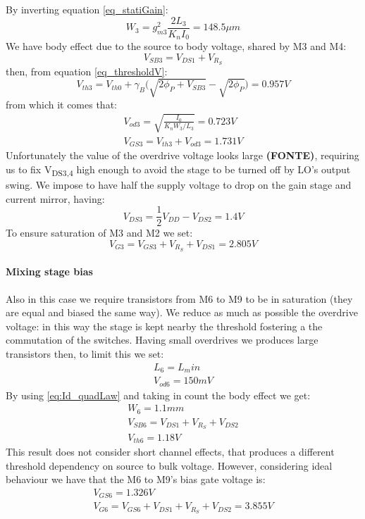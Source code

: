 By inverting equation \ref{eq_statiGain}:
\begin{equation}
W_3 = g_{m3}^2\frac{2L_{3}}{K_nI_0} = 148.5 \mu m
\end{equation}
We have body effect due to the source to body voltage, shared by M3 and M4:
\begin{equation}
	V_{SB3} = V_{DS1}+V_{R_S}
\end{equation} 
then, from equation \ref{eq_thresholdV}:
\begin{equation}
	V_{th3} = V_{th0}+\gamma_B\big(\sqrt{2\phi_P + V_{SB3}}-\sqrt{2\phi_P}\big) = 0.957 V 
\end{equation}
from which it comes that:
\begin{gather}
	V_{od3}=\sqrt{\frac{I_0}{K_n W_3/L_3}} = 0.723 V \\
	V_{GS3} = V_{th3}+V_{od3} = 1.731 V
\end{gather}
Unfortunately the value of the overdrive voltage looks large \textbf{(FONTE)}, requiring us to fix V\textsubscript{DS3,4} high enough to avoid the stage to be turned off by LO's output swing. We impose to have half the supply voltage to drop on the gain stage and current mirror, having:
\begin{equation}
	V_{DS3} = \frac{1}{2}V_{DD}-V_{DS2} = 1.4 V
\end{equation}
To ensure saturation of M3 and M2 we set:
\begin{equation}
	V_{G3}=V_{GS3} +V_{R_{S}}+V_{DS1} = 2.805 V 
\end{equation}

\paragraph{Mixing stage bias}

Also in this case we require transistors from M6 to M9 to be in saturation (they are equal and biased the same way). We reduce as much as possible the overdrive voltage: in this way the stage is kept nearby the threshold fostering a the commutation of the switches. Having small overdrives we produces large transistors then, to limit this we set:
\begin{gather}
	L_6 = L_min  \\
	V_{od6} = 150mV 
\end{gather}
By using \ref{eq:Id_quadLaw} and taking in count the body effect we get:
\begin{gather}
W_6 = 1.1mm \\
V_{SB6} = V_{DS1}+V_{R_S}+V_{DS2}\\
V_{th6} = 1.18V
\end{gather}
This result does not consider short channel effects, that produces a different threshold dependency on source to bulk voltage. However, considering ideal behaviour we have that the M6 to M9's bias gate voltage is:
\begin{gather}
	V_{GS6}=1.326V \\
	V_{G6} = V_{GS6}+V_{DS1}+V_{R_S}+V_{DS2} = 3.855V
\end{gather}







